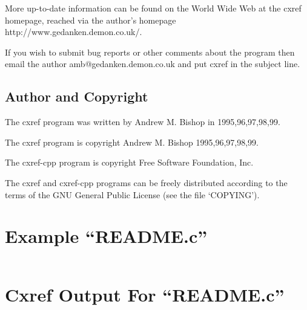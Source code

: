 \documentclass{report}
\begin{document}
More up-to-date information can be found on the World Wide Web at the cxref
homepage, reached via the author's homepage http://www.gedanken.demon.co.uk/.

If you wish to submit bug reports or other comments about the program then email
the author amb@gedanken.demon.co.uk and put cxref in the subject line.

\section{Author and Copyright}

The cxref program was written by Andrew M. Bishop in 1995,96,97,98,99.

The cxref program is copyright Andrew M. Bishop 1995,96,97,98,99.

The cxref-cpp program is copyright Free Software Foundation, Inc.

The cxref and cxref-cpp programs can be freely distributed according to the
terms of the GNU General Public License (see the file `COPYING').

\chapter{Example ``README.c''}


\def\endverbatim{\endtrivlist}
\begin{verbatim}
\end{verbatim}

\chapter{Cxref Output For ``README.c''}







\tableofcontents
\end{document}
